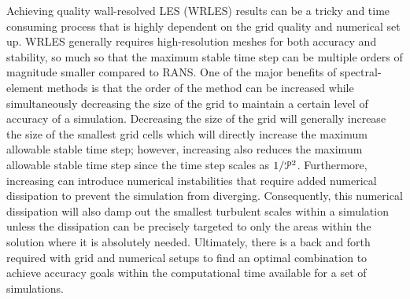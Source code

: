 
Achieving quality wall-resolved LES (WRLES) results can be a tricky and time
consuming process that is highly dependent on the grid quality and numerical set
up.
%
WRLES generally requires high-resolution meshes for both accuracy and stability,
so much so that the maximum stable time step can be multiple orders of magnitude
smaller compared to RANS.
%
One of the major benefits of spectral-element methods is that the order of the
method can be increased while simultaneously decreasing the size of the grid to
maintain a certain level of accuracy of a simulation.
%
Decreasing the size of the grid will generally increase the size of the smallest
grid cells which will directly increase the maximum allowable stable time step;
however, increasing \PO{} also reduces the maximum allowable stable time step
since the time step scales as $1/{\cal P}^2$. 
%
Furthermore, increasing \PO{} can introduce numerical instabilities that require
added numerical dissipation to prevent the simulation from diverging.
%
Consequently, this numerical dissipation will also damp out the smallest
turbulent scales within a simulation unless the dissipation can be precisely
targeted to only the areas within the solution where it is absolutely needed.
%
Ultimately, there is a back and forth required with grid and numerical setups to
find an optimal combination to achieve accuracy goals within the computational
time available for a set of simulations.



